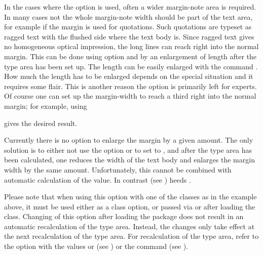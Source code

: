 \begin{Explain}
  In the cases where the option  is used, often a
  wider margin-note area is required.  In many cases not the whole
  margin-note width should be part of the text area, for example if
  the margin is used for quotations.  Such quotations are typeset as
  ragged text with the flushed side where the text body is.  Since
  ragged text gives no homogeneous optical impression, the long lines
  can reach right into the normal margin.  This can be done using
  option  and by an enlargement of length
   after the type area has been set up.  The
  length can be easily enlarged with the command .
  How much the length has to be enlarged depends on the special
  situation and it requires some flair.  This is another reason the
   option is primarily left for experts.  Of course
  one can set up the margin-width to reach a third right into the
  normal margin; for example, using
\begin{lstcode}[belowskip=\dp\strutbox]
  \setlength{\marginparwidth}{1.5\marginparwidth}
\end{lstcode}
  gives the desired result.

  Currently there is no option to enlarge the margin by a given
  amount.  The only solution is to either not use the option
   or to set  to ,
  and after the type area has been calculated, one reduces the
  width of the text body  and enlarges the margin
  width  by the same amount.  Unfortunately,
  this cannot be combined with automatic calculation of the
   value.  In contrast
   (see
  ) heeds
  .
\end{Explain}

Please note that when using this option with one of the {\KOMAScript}
classes as in the example above, it must be used either as a class
option, or passed via  or  after
loading the class. Changing of this option after loading the
 package does not result in an automatic
recalculation of the type area. Instead, the changes only take effect
at the next recalculation of the type area. For recalculation of the
type area, refer to the  option with the values
 or  (see
) or the
 command (see
).%
%
%


